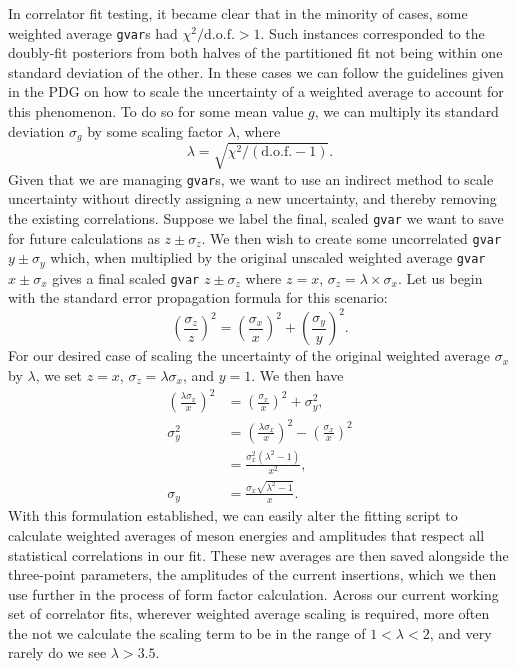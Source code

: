 In correlator fit testing, it became clear that in the minority of cases, some weighted average \verb|gvar|s had $\chi^2/\mathrm{d.o.f.} > 1$.  Such instances corresponded to the doubly-fit posteriors from both halves of the partitioned fit not being within one standard deviation of the other.  In these cases we can follow the guidelines given in the PDG \cite{ParticleDataGroup:2024cfk} on how to scale the uncertainty of a weighted average to account for this phenomenon.  To do so for some mean value $g$, we can multiply its standard deviation $\sigma_g$ by some scaling factor $\lambda$, where
\begin{equation}\label{eq:chi2_scaling}
    \lambda = \sqrt{\chi^2/(\mathrm{d.o.f.}-1)}.
\end{equation}
Given that we are managing \verb|gvar|s, we want to use an indirect method to scale uncertainty without directly assigning a new uncertainty, and thereby removing the existing correlations.  Suppose we label the final, scaled \verb|gvar| we want to save for future calculations as $z \pm\sigma_z$.  We then wish to create some uncorrelated \verb|gvar| $y\pm\sigma_y$ which, when multiplied by the original unscaled weighted average \verb|gvar| $x\pm\sigma_x$ gives a final scaled \verb|gvar| $z \pm\sigma_z$ where $z = x$, $\sigma_z = \lambda \times\sigma_x$.  Let us begin with the standard error propagation formula for this scenario:
\begin{equation}\label{eq:error_prop}
    \left(\frac{\sigma_z}{z}\right)^2 = \left(\frac{\sigma_x}{x}\right)^2 + \left(\frac{\sigma_y}{y}\right)^2.
\end{equation}
For our desired case of scaling the uncertainty of the original weighted average $\sigma_x$ by $\lambda$, we set $z = x$, $\sigma_z = \lambda \sigma_x$, and $y = 1$.  We then have
\begin{equation}\label{eq:error_prop_pt2}
\begin{split}
    \left(\frac{\lambda\sigma_x}{x}\right)^2 &= \left(\frac{\sigma_x}{x}\right)^2 + \sigma_y^2,\\
    \sigma_y^2 &=   \left(\frac{\lambda\sigma_x}{x}\right)^2 - \left(\frac{\sigma_x}{x}\right)^2\\
               &= \frac{\sigma_x^2(\lambda^2-1)}{x^2},\\
    \sigma_y   &= \frac{\sigma_x\sqrt{\lambda^2-1}}{x}.
\end{split}
\end{equation}
With this formulation established, we can easily alter the fitting script to calculate weighted averages of meson energies and amplitudes that respect all statistical correlations in our fit.  These new averages are then saved alongside the three-point parameters, the amplitudes of the current insertions, which we then use further in the process of form factor calculation.  Across our current working set of correlator fits, wherever weighted average scaling is required, more often the not we calculate the scaling term to be in the range of $1<\lambda < 2$, and very rarely do we see $\lambda>3.5$. 




